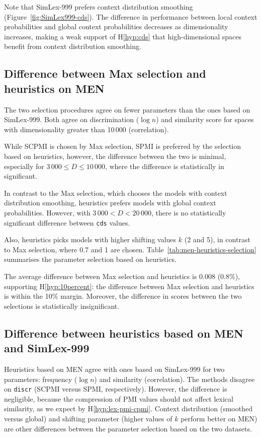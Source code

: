 Note that SimLex-999 prefers context distribution smoothing (Figure~\ref{fig:SimLex999-cds}). The difference in performance between local context probabilities and global context probabilities decreases as dimensionality increases, making a weak support of H\ref{hyp:cds} that high-dimensional spaces benefit from context distribution smoothing.

\subsection{Difference between Max selection and heuristics on MEN}

The two selection procedures agree on fewer parameters than the ones based on SimLex-999. Both agree on discrimination ($\log n$) and similarity score for spaces with dimensionality greater than 10\,000 (correlation).

While SCPMI is chosen by Max selection, SPMI is preferred by the selection based on heuristics, however, the difference between the two is minimal, especially for $3\,000 \le D \le 10\,000$, where the difference is statistically in significant.

In contrast to the Max selection, which chooses the models with context distribution smoothing, heuristics prefers models with global context probabilities. However, with $3\,000 < D <20\,000$, there is no statistically significant difference between \texttt{cds} values.

Also, heuristics picks models with higher shifting values $k$ (2 and 5), in contrast to Max selection, where 0.7 and 1 are chosen. Table~\ref{tab:men-heuristics-selection} summarises the parameter selection based on heuristics.

The average difference between Max selection and heuristics is 0.008 (0.8\%), supporting H\ref{hyp:10percent}: the difference between Max selection and heuristics is within the 10\% margin. Moreover, the difference in scores between the two selections is statistically insignificant.

\subsection{Difference between heuristics based on MEN and SimLex-999}

Heuristics based on MEN agree with ones based on SimLex-999 for two parameters: frequency ($\log n$) and similarity (correlation). The methods disagree on \texttt{discr} (SCPMI versus SPMI, respectively). However, the difference is negligible, because the compression of PMI values should not affect lexical similarity, as we expect by H\ref{hyp:lex-pmi-cpmi}. Context distribution (smoothed versus global) and shifting parameter (higher values of $k$ perform better on MEN) are other differences between the parameter selection based on the two datasets.

